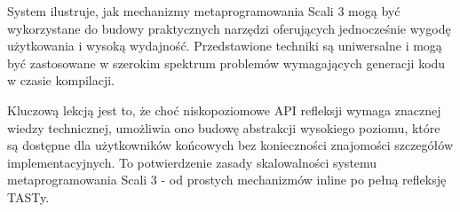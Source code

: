 System ilustruje, jak mechanizmy metaprogramowania Scali 3 mogą być wykorzystane do budowy praktycznych narzędzi oferujących jednocześnie wygodę użytkowania i wysoką wydajność.
Przedstawione techniki są uniwersalne i mogą być zastosowane w szerokim spektrum problemów wymagających generacji kodu w czasie kompilacji.

Kluczową lekcją jest to, że choć niskopoziomowe API refleksji wymaga znacznej wiedzy technicznej, umożliwia ono budowę abstrakcji wysokiego poziomu, które są dostępne dla użytkowników końcowych bez konieczności znajomości szczegółów implementacyjnych.
To potwierdzenie zasady skalowalności systemu metaprogramowania Scali 3 - od prostych mechanizmów inline po pełną refleksję TASTy.
